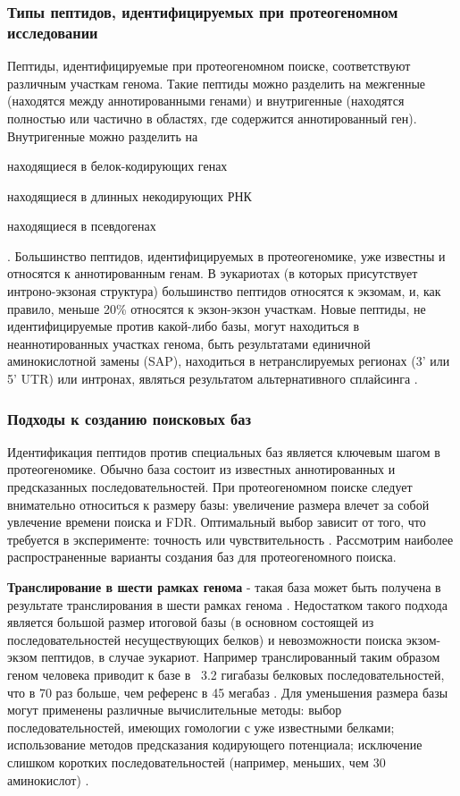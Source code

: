 \subsubsection{Типы пептидов, идентифицируемых при протеогеномном исследовании}
Пептиды, идентифицируемые при протеогеномном поиске, соответствуют различным участкам генома. Такие пептиды можно разделить на межгенные (находятся между аннотированными генами) и внутригенные (находятся полностью или частично в областях, где содержится аннотированный ген). Внутригенные можно разделить на 
\begin{inparaenum}
    \item находящиеся в белок-кодирующих генах 
    \item находящиеся в длинных некодирующих РНК
    \item находящиеся в псевдогенах
\end{inparaenum} \cite{harrow2012gencode}. Большинство пептидов, идентифицируемых в протеогеномике, уже известны и относятся к аннотированным генам. В эукариотах (в которых присутствует интроно-экзоная структура) большинство пептидов относятся к экзомам, и, как правило, меньше 20\% относятся к экзон-экзон участкам. Новые пептиды, не идентифицируемые против какой-либо базы, могут находиться в неаннотированных участках генома, быть результатами единичной аминокислотной замены (SAP), находиться в нетранслируемых регионах (3' или 5' UTR) или интронах, являться результатом альтернативного сплайсинга \cite{nesvizhskii2014proteogenomics}.

\subsubsection{Подходы к созданию поисковых баз}
Идентификация пептидов против специальных баз является ключевым шагом в протеогеномике. Обычно база состоит из известных аннотированных и предсказанных последовательностей. При протеогеномном поиске следует внимательно относиться к размеру базы: увеличение размера влечет за собой увлечение времени поиска и FDR. Оптимальный выбор зависит от того, что требуется в эксперименте: точность или чувствительность \cite{nesvizhskii2014proteogenomics}. Рассмотрим наиболее распространенные варианты создания баз для протеогеномного поиска.

\textbf{Транслирование в шести рамках генома} - такая база может быть получена в результате транслирования в шести рамках генома \cite{baerenfaller2008genome}. Недостатком такого подхода является большой размер итоговой базы (в основном состоящей из последовательностей несуществующих белков) и невозможности поиска экзом-экзом пептидов, в случае эукариот. Например транслированный таким образом геном человека приводит к базе в ~3.2 гигабазы белковых последовательностей, что в 70 раз больше, чем референс в 45 мегабаз \cite{khatun2013whole}. Для уменьшения размера базы могут применены различные вычислительные методы: выбор последовательностей, имеющих гомологии с уже известными белками; использование методов предсказания кодирующего потенциала; исключение слишком коротких последовательностей (например, меньших, чем 30 аминокислот) \cite{blakeley2012addressing}. 

